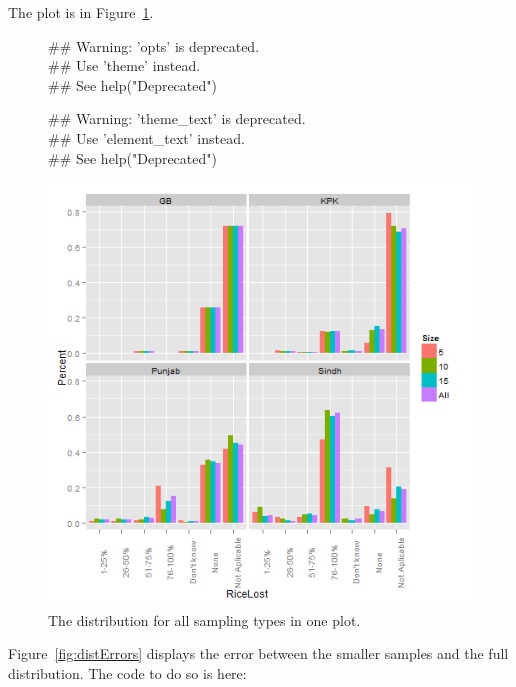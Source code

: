 The plot is in Figure~\ref{fig:allDistInOne}.
\begin{figure}[!hbtp]
\begin{knitrout}
\color{fgcolor}\begin{kframe}


{\ttfamily\noindent\textcolor{warningcolor}{\#\# Warning: 'opts' is deprecated.\\\#\# Use 'theme' instead.\\\#\# See help("Deprecated")}}

{\ttfamily\noindent\textcolor{warningcolor}{\#\# Warning: 'theme\_text' is deprecated.\\\#\# Use 'element\_text' instead.\\\#\# See help("Deprecated")}}\end{kframe}\includegraphics[width=.9\linewidth]{smallerDist/figures/allDistInOnePlot} 
\end{knitrout}

\caption{The distribution for all sampling types in one plot.\label{fig:allDistInOne}}
\end{figure}

Figure~\ref{fig:distErrors} displays the error between the smaller samples and the full distribution.  The code to do so is here:

